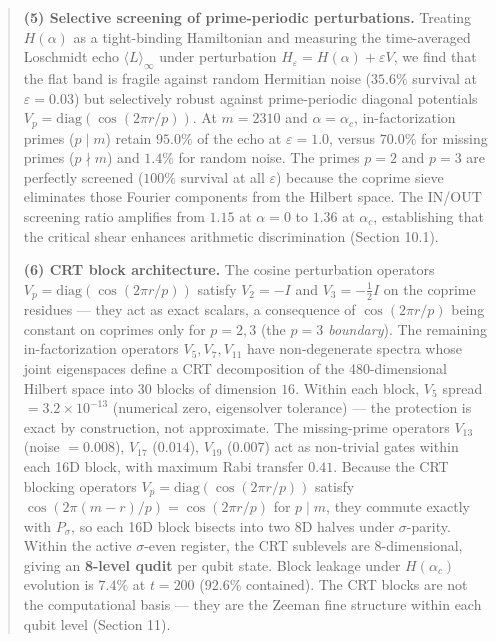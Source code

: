 \documentclass[11pt,letterpaper]{article}
\theoremstyle{definition}
\theoremstyle{remark}
\begin{document}
\begin{abstract}
\textbf{(5) Selective screening of prime-periodic perturbations.} Treating $H(\alpha)$ as a tight-binding Hamiltonian and measuring the time-averaged Loschmidt echo $\langle L \rangle_\infty$ under perturbation $H_\varepsilon = H(\alpha) + \varepsilon V$, we find that the flat band is fragile against random Hermitian noise ($35.6\%$ survival at $\varepsilon = 0.03$) but selectively robust against prime-periodic diagonal potentials $V_p = \text{diag}(\cos(2\pi r/p))$. At $m = 2310$ and $\alpha = \alpha_c$, in-factorization primes ($p \mid m$) retain $95.0\%$ of the echo at $\varepsilon = 1.0$, versus $70.0\%$ for missing primes ($p \nmid m$) and $1.4\%$ for random noise. The primes $p = 2$ and $p = 3$ are perfectly screened ($100\%$ survival at all $\varepsilon$) because the coprime sieve eliminates those Fourier components from the Hilbert space. The IN/OUT screening ratio amplifies from $1.15$ at $\alpha = 0$ to $1.36$ at $\alpha_c$, establishing that the critical shear enhances arithmetic discrimination (Section 10.1).

\textbf{(6) CRT block architecture.} The cosine perturbation operators $V_p = \text{diag}(\cos(2\pi r/p))$ satisfy $V_2 = -I$ and $V_3 = -\tfrac{1}{2}I$ on the coprime residues --- they act as exact scalars, a consequence of $\cos(2\pi r/p)$ being constant on coprimes only for $p = 2, 3$ (the \emph{$p = 3$ boundary}). The remaining in-factorization operators $V_5, V_7, V_{11}$ have non-degenerate spectra whose joint eigenspaces define a CRT decomposition of the 480-dimensional Hilbert space into $30$ blocks of dimension $16$. Within each block, $V_5$ spread $= 3.2 \times 10^{-13}$ (numerical zero, eigensolver tolerance) --- the protection is exact by construction, not approximate. The missing-prime operators $V_{13}$ (noise $= 0.008$), $V_{17}$ ($0.014$), $V_{19}$ ($0.007$) act as non-trivial gates within each 16D block, with maximum Rabi transfer $0.41$. Because the CRT blocking operators $V_p = \text{diag}(\cos(2\pi r/p))$ satisfy $\cos(2\pi(m-r)/p) = \cos(2\pi r/p)$ for $p \mid m$, they commute exactly with $P_\sigma$, so each 16D block bisects into two 8D halves under $\sigma$-parity. Within the active $\sigma$-even register, the CRT sublevels are 8-dimensional, giving an \textbf{8-level qudit} per qubit state. Block leakage under $H(\alpha_c)$ evolution is $7.4\%$ at $t = 200$ ($92.6\%$ contained). The CRT blocks are not the computational basis --- they are the Zeeman fine structure within each qubit level (Section 11).


\end{abstract}
\end{document}

